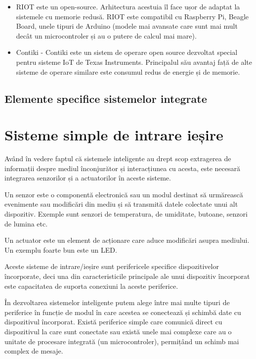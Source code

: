 \begin{itemize}
	\item RIOT este un open-source. Arhitectura acestuia îl face ușor de
		adaptat la sistemele cu memorie redusă. RIOT este compatibil cu
		Raspberry Pi, Beagle Board, unele tipuri de Arduino (modele mai
		avansate care sunt mai mult decât un microcontroler și au o
		putere de calcul mai mare).
	\item Contiki - Contiki este un sistem de operare open source dezvoltat
		special pentru sisteme IoT de Texas Instruments. Principalul său
		avantaj față de alte sisteme de operare similare este consumul
		redus de energie și de memorie.
\end{itemize}

\subsection{Elemente specifice sistemelor integrate}
\label{sec:embed-ics-elem}

\section{Sisteme simple de intrare ieșire}
\label{sec:embed-io}

Având în vedere faptul că sistemele inteligente au drept scop extragerea de
informații despre mediul înconjurător și interacțiunea cu acesta, este necesară
integrarea senzorilor și a actuatorilor în aceste sisteme.

Un senzor este o componentă electronică sau un modul destinat să urmărească
evenimente sau modificări din mediu și să transmită datele colectate unui alt
dispozitiv. Exemple sunt senzori de temperatura, de umiditate, butoane, senzori
de lumina etc.

Un actuator este un element de acționare care aduce modificări asupra mediului.
Un exemplu foarte bun este un LED.

Aceste sisteme de intrare/ieșire sunt perifericele specifice dispozitivelor
încorporate, deci una din caracteristicile principale ale unui dispozitiv
încorporat este capacitatea de suporta conexiuni la aceste periferice.

În dezvoltarea sistemelor inteligente putem alege între mai multe tipuri de
periferice în funcție de modul în care acestea se conectează și schimbă date cu
dispozitivul încorporat. Există periferice simple care comunică direct cu
dispozitivul la care sunt conectate sau există unele mai complexe care au o
unitate de procesare integrată (un microcontroler), permițând un schimb mai
complex de mesaje.

